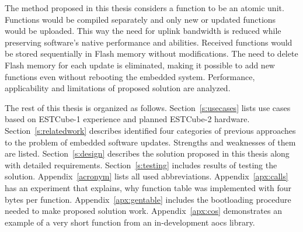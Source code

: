 The method proposed in this thesis considers a function to be an atomic unit. Functions would be compiled separately and only new or updated functions would be uploaded.  This way the need for uplink bandwidth is reduced while preserving software's native performance and abilities. Received functions would be stored sequentially in Flash memory without modifications. The need to delete Flash memory for each update is eliminated, making it possible to add new functions even without rebooting the embedded system. Performance, applicability and limitations of proposed solution are analyzed.

The rest of this thesis is organized as follows. Section~\ref{s:usecases} lists use cases based on ESTCube-1 experience and planned ESTCube-2 hardware. Section~\ref{s:relatedwork} describes identified four categories of previous approaches to the problem of embedded software updates. Strengths and weaknesses of them are listed. Section~\ref{s:design} describes the solution proposed in this thesis along with detailed requirements. Section~\ref{s:testing} includes results of testing the solution. Appendix~\ref{acronym} lists all used abbreviations. Appendix~\ref{apx:calls} has an experiment that explains, why function table was implemented with four bytes per function. Appendix~\ref{apx:gentable} includes the bootloading procedure needed to make proposed solution work. Appendix~\ref{apx:cos} demonstrates an example of a very short function from an in-development \gls{aocs} library.
